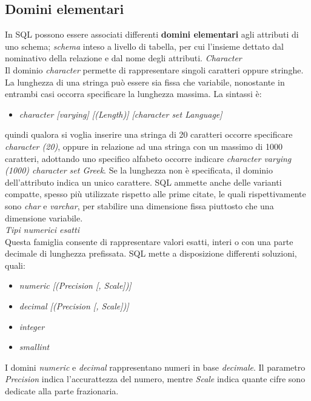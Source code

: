 \documentclass{article}
\begin{document}
\subsection*{Domini elementari}
\large
In SQL possono essere associati differenti \textbf{domini elementari} agli attributi di uno schema; \textit{schema} inteso a livello di tabella, per cui l'insieme dettato dal nominativo della relazione e dal nome degli attributi.
\textit{Character}\\Il dominio \textit{character} permette di rappresentare singoli caratteri oppure stringhe. La lunghezza di una stringa può essere sia fissa che variabile, nonostante in entrambi casi occorra specificare la lunghezza massima. La sintassi è:
\begin{itemize}[label={ }, leftmargin=1cm] 
    \item \textit{character [varying] [(Length)] [character set Language]}
\end{itemize}
quindi qualora si voglia inserire una stringa di 20 caratteri occorre specificare \textit{character (20)}, oppure in relazione ad una stringa con un massimo di 1000 caratteri, adottando uno specifico alfabeto occorre indicare \textit{character varying (1000) character set Greek}. Se la lunghezza non è specificata, il dominio dell'attributo indica un unico carattere. SQL ammette anche delle varianti compatte, spesso più utilizzate rispetto alle prime citate, le quali rispettivamente sono \textit{char} e \textit{varchar}, per stabilire una dimensione fissa piuttosto che una dimensione variabile.\vspace*{14pt}\\
\textit{Tipi numerici esatti}\\Questa famiglia consente di rappresentare valori esatti, interi o con una parte decimale di lunghezza prefissata. SQL mette a disposizione differenti soluzioni, quali:
\begin{itemize}[label={ }, leftmargin=1cm]
    \itemsep0em
    \item \textit{numeric [(Precision [, Scale])]}
    \item \textit{decimal [(Precision [, Scale])]}
    \item \textit{integer}
    \item \textit{smallint}
\end{itemize}
I domini \textit{numeric} e \textit{decimal} rappresentano numeri in base \textit{decimale}. Il parametro \textit{Precision} indica l'accurattezza del numero, mentre \textit{Scale} indica quante cifre sono dedicate alla parte frazionaria.
\end{document}
